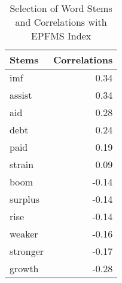 \begin{table}[ht]
\centering
\caption{Selection of Word Stems and Correlations with EPFMS Index} 
\label{stem_correlations}
\begin{tabular}{lr}
  \hline
Stems & Correlations \\ 
  \hline
imf & 0.34 \\ 
  assist & 0.34 \\ 
  aid & 0.28 \\ 
  debt & 0.24 \\ 
  paid & 0.19 \\ 
  strain & 0.09 \\ 
  boom & -0.14 \\ 
  surplus & -0.14 \\ 
  rise & -0.14 \\ 
  weaker & -0.16 \\ 
  stronger & -0.17 \\ 
  growth & -0.28 \\ 
   \hline
\end{tabular}
\end{table}
